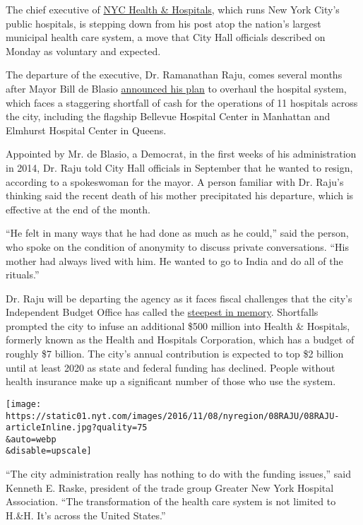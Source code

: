 The chief executive of
\href{http://www.nychealthandhospitals.org/hhc/html/home/home.shtml}{NYC
Health \& Hospitals}, which runs New York City's public hospitals, is
stepping down from his post atop the nation's largest municipal health
care system, a move that City Hall officials described on Monday as
voluntary and expected.

The departure of the executive, Dr. Ramanathan Raju, comes several
months after Mayor Bill de Blasio
\href{http://www.nytimes.com/2016/04/26/nyregion/de-blasio-to-propose-2-billion-for-new-york-citys-hospital-system.html}{announced
his plan} to overhaul the hospital system, which faces a staggering
shortfall of cash for the operations of 11 hospitals across the city,
including the flagship Bellevue Hospital Center in Manhattan and
Elmhurst Hospital Center in Queens.

Appointed by Mr. de Blasio, a Democrat, in the first weeks of his
administration in 2014, Dr. Raju told City Hall officials in September
that he wanted to resign, according to a spokeswoman for the mayor. A
person familiar with Dr. Raju's thinking said the recent death of his
mother precipitated his departure, which is effective at the end of the
month.

``He felt in many ways that he had done as much as he could,'' said the
person, who spoke on the condition of anonymity to discuss private
conversations. ``His mother had always lived with him. He wanted to go
to India and do all of the rituals.''

Dr. Raju will be departing the agency as it faces fiscal challenges that
the city's Independent Budget Office has called the
\href{http://www.ibo.nyc.ny.us/iboreports/critical-condition-reviving-the-fiscal-health-of-the-citys-public-hospitals-will-take-state-federal-and-union-cooperation-june-2016.pdf}{steepest
in memory}. Shortfalls prompted the city to infuse an additional \$500
million into Health \& Hospitals, formerly known as the Health and
Hospitals Corporation, which has a budget of roughly \$7 billion. The
city's annual contribution is expected to top \$2 billion until at least
2020 as state and federal funding has declined. People without health
insurance make up a significant number of those who use the system.

\texttt{[image: https://static01.nyt.com/images/2016/11/08/nyregion/08RAJU/08RAJU-articleInline.jpg?quality=75\\\&auto=webp\\\&disable=upscale]}

``The city administration really has nothing to do with the funding
issues,'' said Kenneth E. Raske, president of the trade group Greater
New York Hospital Association. ``The transformation of the health care
system is not limited to H.\&H. It's across the United States.''

